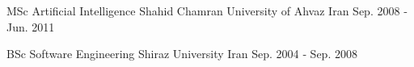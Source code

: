 


\begin{cventries}


\cventry
{MSc Artificial Intelligence} %
{Shahid Chamran University of Ahvaz} %
{Iran} %
{Sep. 2008 ‑ Jun. 2011} %
{}

\cventry
{BSc Software Engineering} %
{Shiraz University} %
{Iran} %
{Sep. 2004 ‑ Sep. 2008} %
{}

\end{cventries}